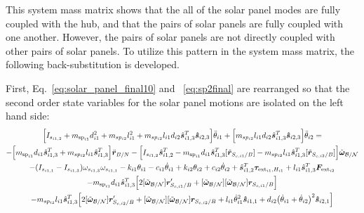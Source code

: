 \documentclass[paper]{aiaaNew}
\begin{document}
	This system mass matrix shows that the all of the solar panel modes are fully coupled with the hub, and that the pairs of solar panels are fully coupled with one another. However, the pairs of solar panels are not directly coupled with other pairs of solar panels. To utilize this pattern in the system mass matrix, the following back-substitution is developed. 
	
	First, Eq.~\eqref{eq:solar_panel_final10} and ~\eqref{eq:sp2final} are rearranged so that the second order state variables for the solar panel motions are isolated on the left hand side:
\begin{multline}
\Big[I_{s_{i1,2}}+ m_{\text{sp}_{i1}} d_{i1}^2 + m_{sp_{i2}} l_{i1}^2 + m_{sp_{i2}} l_{i1} d_{i2} \hat{\bm s}_{i1,3}^T \bm{\hat{s}}_{i2,3} \Big] \ddot\theta_{i1} + \Big[m_{sp_{i2}} l_{i1} d_{i2} \hat{\bm s}_{i1,3}^T \bm{\hat{s}}_{i2,3} \Big] \ddot{\theta}_{i2}=\\
-\Big[m_{\text{sp}_{i1}} d_{i1} \hat{\bm s}_{i1,3}^T + m_{sp_{i2}} l_{i1} \hat{\bm s}_{i1,3}^T \Big] \ddot{\bm{r}}_{B/N} - \Big[I_{s_{i1,2}} \hat{\bm s}_{i1,2}^T - m_{\text{sp}_{i1}} d_{i1} \hat{\bm s}_{i1,3}^T [\tilde{\bm{r}}_{S_{c,i1}/B}] - m_{sp_{i2}} l_{i1} \hat{\bm s}_{i1,3}^T [\tilde{\bm{r}}_{S_{c,i2}/B}] \Big]\dot{\bm\omega}_{\cal B/N} \\
- (I_{s_{i1,1}} - I_{s_{i1,3}}) \omega_{s_{i1,3}} \omega_{s_{i1,1}} - k_{i1} \theta_{i1} - c_{i1}\dot{\theta}_{i1} 
+  k_{i2} \theta_{i2} + c_{i2} \dot\theta_{i2} 
+ \hat{\bm s}_{i1,2}^T \bm \tau_{\text{ext}_{i1},H_{i1}} + l_{i1} \hat{\bm s}_{i1,3}^T \bm F_{\text{ext}_{i2}}\\ 
- m_{\text{sp}_{i1}} d_{i1} \hat{\bm s}_{i1,3}^T \Big[2 [\tilde{\bm\omega}_{\cal B/N}] \bm{r}'_{S_{c,i1}/B}
+ [\tilde{\bm\omega}_{\cal B/N}] [\tilde{\bm\omega}_{\cal B/N}] \bm{r}_{S_{c,i1}/B}\Big]
\\
- m_{sp_{i2}} l_{i1} \hat{\bm s}_{i1,3}^T \Big[ 2 [\tilde{\bm\omega}_{\cal B/N}] \bm{r}'_{S_{c,i2}/B} 
+ [\tilde{\bm\omega}_{\cal B/N}] [\tilde{\bm\omega}_{\cal B/N}] \bm{r}_{S_{c,i2}/B} + l_{i1} \dot{\theta}_{i1}^2 \bm{\hat{s}}_{i1,1} + d_{i2}\big(\dot{\theta}_{i1} + \dot{\theta}_{i2}\big)^2\bm{\hat{s}}_{i2,1}\Big]
\label{eq:spMotion1}
\end{multline}
	
\end{document}
